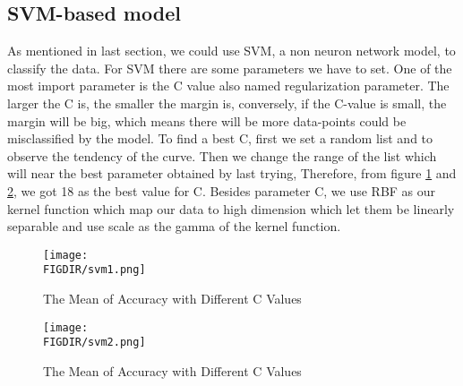 \subsection{SVM-based model}
As mentioned in last section, we could use SVM, a non neuron network model, to classify the data. For SVM there are some parameters we have to set. One of the most import parameter is the C value also named regularization parameter. The larger the C is, the smaller the margin is, conversely, if the C-value is small, the margin will be big, which means there will be more data-points could be misclassified by the model. To find a best C, first we set a random list and to observe the tendency of the curve. Then we change the range of the list which will near the best parameter obtained by last trying, Therefore, from figure \ref{SVM1} and \ref{SVM2}, we got 18 as the best value for C. Besides parameter C, we use RBF as our kernel function which map our data to high dimension which let them be linearly separable and use scale as the gamma of the kernel function. 
\begin{figure}[ht]
\centering
\texttt{[image: \\FIGDIR/svm1.png]}
\caption{The Mean of Accuracy with Different C Values}
\label{SVM1}
\end{figure}
\begin{figure}[ht]
\centering
\texttt{[image: \\FIGDIR/svm2.png]}
\caption{The Mean of Accuracy with Different C Values}
\label{SVM2}
\end{figure}
